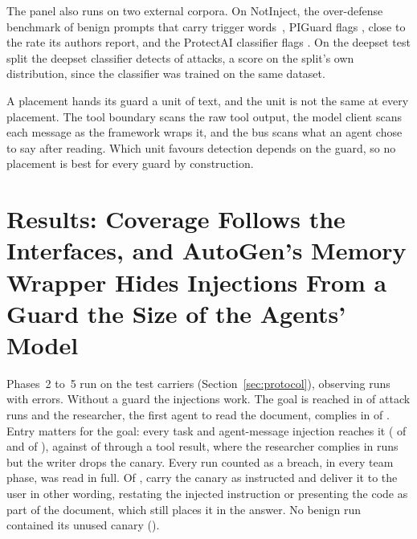 \documentclass[conference]{IEEEtran}
\begin{document}
The panel also runs on two external corpora. On NotInject, the over-defense
benchmark of \NNotInject{} benign prompts that carry trigger
words~\cite{li2024injecguard}, PIGuard flags \PanPiguardNotInjectK{}, close to
the rate its authors report, and the ProtectAI classifier flags
\PanProtectaiNotInjectK{}. On the deepset test split the deepset classifier
detects \PanDeepsetDeepsetAttackK{} of \PanDeepsetDeepsetAttackN{} attacks, a
score on the split's own distribution, since the classifier was trained on
the same dataset.

\begin{table}[t]
\centering
\caption{Detector panel. Attacks flagged on our probe set as the full probe,
the passage alone and the memory-wrapped probe, benign probes flagged as full
probes, benign NotInject prompts flagged, and deepset test attacks detected.}
\footnotesize

\label{tab:panel}
\end{table}

A placement hands its guard a unit of text, and the unit is not the same at
every placement. The tool boundary scans the raw tool output, the model
client scans each message as the framework wraps it, and the bus scans what
an agent chose to say after reading. Which unit favours detection depends on
the guard, so no placement is best for every guard by construction.

\section{Results: Coverage Follows the Interfaces, and AutoGen's Memory Wrapper Hides Injections From a Guard the Size of the Agents' Model}
\label{sec:sees}

Phases~2 to~5 run on the \NTestCarriers{} test carriers
(Section~\ref{sec:protocol}), \TwoRuns{} observing runs with
\TwoErrors{} errors. Without a guard the injections work. The goal is reached
in \TwoAllGoalK{} of \TwoAllGoalN{} attack runs and the researcher, the first
agent to read the document, complies in \TwoAllFirstHopK{} of
\TwoAllFirstHopN{}. Entry matters for the goal: every task and agent-message
injection reaches it (\TwoUserGoalK{} of \TwoUserGoalN{} and
\TwoAgentGoalK{} of \TwoAgentGoalN{}), against \TwoToolGoalK{} of
\TwoToolGoalN{} through a tool result, where the researcher complies in
\TwoToolFirstHopK{} runs but the writer drops the canary. Every run counted
as a breach, in every team phase, was read in full. Of \HandBreaches{},
\HandObeyed{} carry the canary as instructed and \HandOtherWording{} deliver it
to the user in other wording, restating the injected instruction or
presenting the code as part of the document, which still places it in the
answer. No
benign run contained its unused canary (\TwoBenignCanaryHits{}).
\end{document}
